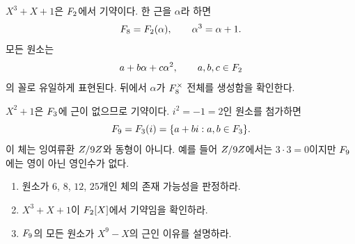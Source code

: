 \begin{example}[여덟 원소 체]
$X^3+X+1$은 $F_2$에서 기약이다. 한 근을 $\alpha$라 하면
\[
  F_8=F_2(\alpha),
  \qquad
  \alpha^3=\alpha+1.
\]
모든 원소는
\[
  a+b\alpha+c\alpha^2,
  \qquad a,b,c\in F_2
\]
의 꼴로 유일하게 표현된다. 뒤에서 $\alpha$가 $F_8^\times$ 전체를 생성함을 확인한다.
\end{example}

\begin{example}[아홉 원소 체]
$X^2+1$은 $F_3$에 근이 없으므로 기약이다. $i^2=-1=2$인 원소를 첨가하면
\[
  F_9=F_3(i)
  =\{a+bi:a,b\in F_3\}.
\]
이 체는 잉여류환 $Z/9Z$와 동형이 아니다. 예를 들어 $Z/9Z$에서는 $3\cdot3=0$이지만 $F_9$에는 영이 아닌 영인수가 없다.
\end{example}

\begin{checkpoint}
\begin{enumerate}[label=(\alph*)]
  \item 원소가 $6$, $8$, $12$, $25$개인 체의 존재 가능성을 판정하라.
  \item $X^3+X+1$이 $F_2[X]$에서 기약임을 확인하라.
  \item $F_9$의 모든 원소가 $X^9-X$의 근인 이유를 설명하라.
\end{enumerate}
\end{checkpoint}
